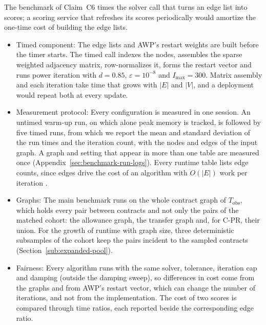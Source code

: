 
The benchmark of Claim~C6 times the solver call that turns an edge list into scores; a scoring service that refreshes its scores periodically would amortize the one-time cost of building the edge lists.

\begin{itemize}
\item Timed component: The edge lists and AWP's restart weights are built before the timer starts. The timed call indexes the nodes, assembles the sparse weighted adjacency matrix, row-normalizes it, forms the restart vector and runs power iteration with $d=0.85$, $\varepsilon=10^{-8}$ and $I_{\max}=300$. Matrix assembly and each iteration take time that grows with $|E|$ and $|V|$, and a deployment would repeat both at every update.

\item Measurement protocol: Every configuration is measured in one session. An untimed warm-up run, on which alone peak memory is tracked, is followed by five timed runs, from which we report the mean and standard deviation of the run times and the iteration count, with the nodes and edges of the input graph. A graph and setting that appear in more than one table are measured once (Appendix~\ref{sec:benchmark-run-logs}). Every runtime table lists edge counts, since edges drive the cost of an algorithm with $O(|E|)$ work per iteration \parencite{langville2006pagerank}.

\item Graphs: The main benchmark runs on the whole contract graph of $T_{\mathrm{obs}}$, which holds every pair between contracts and not only the pairs of the matched cohort: the allowance graph, the transfer graph and, for \mbox{C-PR}, their union. For the growth of runtime with graph size, three deterministic subsamples of the cohort keep the pairs incident to the sampled contracts (Section~\ref{sub:expanded-pool}).

\item Fairness: Every algorithm runs with the same solver, tolerance, iteration cap and damping (outside the damping sweep), so differences in cost come from the graphs and from AWP's restart vector, which can change the number of iterations, and not from the implementation. The cost of two scores is compared through time ratios, each reported beside the corresponding edge ratio.

\end{itemize}

